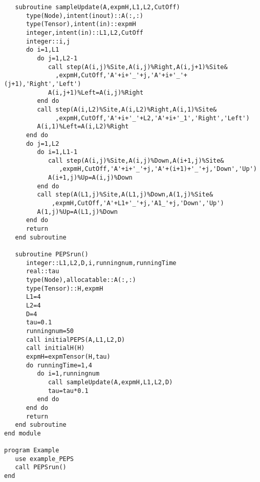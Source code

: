 \documentclass[preprint,3p,times,preprint,showpacs,amsmath,superscriptaddress,floatfix]{elsarticle}
\begin{document}
\begin{verbatim}
   subroutine sampleUpdate(A,expmH,L1,L2,CutOff)
      type(Node),intent(inout)::A(:,:)
      type(Tensor),intent(in)::expmH
      integer,intent(in)::L1,L2,CutOff
      integer::i,j
      do i=1,L1
         do j=1,L2-1
            call step(A(i,j)%Site,A(i,j)%Right,A(i,j+1)%Site&
              ,expmH,CutOff,'A'+i+'_'+j,'A'+i+'_'+(j+1),'Right','Left')
            A(i,j+1)%Left=A(i,j)%Right
         end do
         call step(A(i,L2)%Site,A(i,L2)%Right,A(i,1)%Site&
              ,expmH,CutOff,'A'+i+'_'+L2,'A'+i+'_1','Right','Left')
         A(i,1)%Left=A(i,L2)%Right
      end do
      do j=1,L2
         do i=1,L1-1
            call step(A(i,j)%Site,A(i,j)%Down,A(i+1,j)%Site&
               ,expmH,CutOff,'A'+i+'_'+j,'A'+(i+1)+'_'+j,'Down','Up')
            A(i+1,j)%Up=A(i,j)%Down
         end do
         call step(A(L1,j)%Site,A(L1,j)%Down,A(1,j)%Site&
             ,expmH,CutOff,'A'+L1+'_'+j,'A1_'+j,'Down','Up')
         A(1,j)%Up=A(L1,j)%Down
      end do
      return
   end subroutine

   subroutine PEPSrun()
      integer::L1,L2,D,i,runningnum,runningTime
      real::tau
      type(Node),allocatable::A(:,:)
      type(Tensor)::H,expmH
      L1=4
      L2=4
      D=4
      tau=0.1
      runningnum=50
      call initialPEPS(A,L1,L2,D)
      call initialH(H)
      expmH=expmTensor(H,tau)
      do runningTime=1,4
         do i=1,runningnum
            call sampleUpdate(A,expmH,L1,L2,D)
            tau=tau*0.1
         end do
      end do
      return
   end subroutine
end module

program Example
   use example_PEPS
   call PEPSrun()
end
\end{verbatim}
\end{document}
